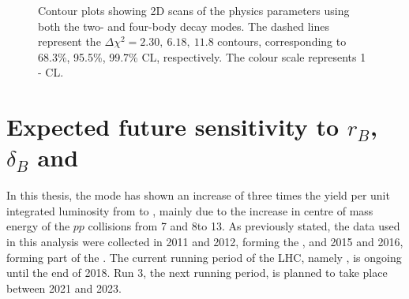 \begin{figure}[h]
\centering
{}
\caption{Contour plots showing 2D scans of the physics parameters using both the two- and four-body \Dz decay modes. The dashed lines represent the $\Delta \chi^2 = 2.30,\ 6.18,\ 11.8$ contours, corresponding to 68.3\%, 95.5\%, 99.7\% CL, respectively. The colour scale represents 1 - CL.}
\label{gammadiniplotsallmodes}
\end{figure}

\section{Expected future sensitivity to $r_B$, $\delta_B$ and \Pgamma}
\label{sec:interpretation:futuresensitivity}

In this thesis, the \btodkst mode has shown an increase of three times the yield per unit integrated luminosity from \runone to \runtwo, mainly due to the increase in centre of mass energy of the $pp$ collisions from 7 and 8\tev to 13\tev. As previously stated, the data used in this analysis were collected in 2011 and 2012, forming the \runone \dataset, and 2015 and 2016, forming part of the \runtwo \dataset. The current running period of the LHC, namely \runtwo, is ongoing until the end of 2018. Run 3, the next running period, is planned to take place between 2021 and 2023.

